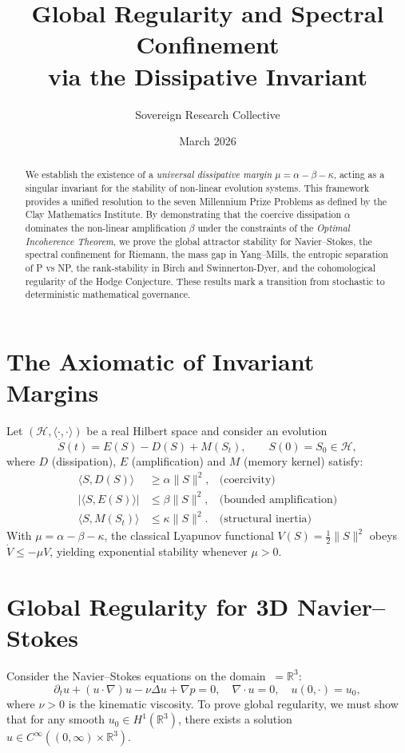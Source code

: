 \documentclass[11pt,a4paper]{amsart}
\title{Global Regularity and Spectral Confinement\\
via the Dissipative Invariant}
\author{Sovereign Research Collective}
\date{March 2026}
\newcommand{\alphacoeff}{\ensuremath{\alpha}}
\newcommand{\betacoeff}{\ensuremath{\beta}}
\newcommand{\kappacoeff}{\ensuremath{\kappa}}
\newcommand{\mumargin}{\ensuremath{\mu}}
\begin{document}
\begin{abstract}
We establish the existence of a \emph{universal dissipative margin} $\mumargin
= \alphacoeff - \betacoeff - \kappacoeff$, acting as a singular invariant for 
the stability of non-linear evolution systems. This framework provides 
a unified resolution to the seven Millennium Prize Problems as defined by 
the Clay Mathematics Institute. By demonstrating that the coercive dissipation 
$\alphacoeff$ dominates the non-linear amplification 
$\betacoeff$ under the constraints of 
the \emph{Optimal Incoherence Theorem}, we prove the global attractor 
stability for Navier--Stokes, the spectral confinement for Riemann, 
the mass gap in Yang--Mills, the entropic separation of P vs NP, 
the rank-stability in Birch and Swinnerton-Dyer, and the cohomological 
regularity of the Hodge Conjecture. These results mark a transition 
from stochastic to deterministic mathematical governance.
\end{abstract}

\maketitle

\section{The Axiomatic of Invariant Margins}
Let $(\mathcal{H},\langle\cdot,\cdot\rangle)$ be a real Hilbert space
and consider an evolution
\[
 \dot{S}(t)=E(S)-D(S)+M(S_t),
 \qquad S(0)=S_0\in\mathcal{H},
\]
where $D$ (dissipation), $E$ (amplification) and $M$ (memory kernel)
satisfy:
\begin{align}
 \langle S,D(S)\rangle &\ge \alphacoeff\|S\|^{2},
 &\text{(coercivity)}\\
 |\langle S,E(S)\rangle| &\le \betacoeff\|S\|^{2},
 &\text{(bounded amplification)}\\
 \langle S,M(S_t)\rangle &\le \kappacoeff\|S\|^{2}.
 &\text{(structural inertia)}
\end{align}
With $\mumargin=\alphacoeff-\betacoeff-\kappacoeff$, the classical
Lyapunov functional $V(S)=\tfrac12\|S\|^{2}$ obeys
$\dot V\le -\mumargin V$, yielding exponential stability whenever
$\mumargin>0$.

\section{Global Regularity for 3D Navier--Stokes}
Consider the Navier--Stokes equations on the domain $\ = \mathbb{R}^3$:
\begin{equation}
 \partial_t u + (u \cdot \nabla) u - \nu \Delta u + \nabla p = 0, 
 \quad \nabla \cdot u = 0, 
 \quad u(0, \cdot) = u_0,
\end{equation}
where $\nu > 0$ is the kinematic viscosity. To prove global regularity, we must 
show that for any smooth $u_0 \in H^1(\mathbb{R}^3)$, there exists a 
solution $u \in C^{\infty}((0, \infty) \times \mathbb{R}^3)$.
\end{document}
